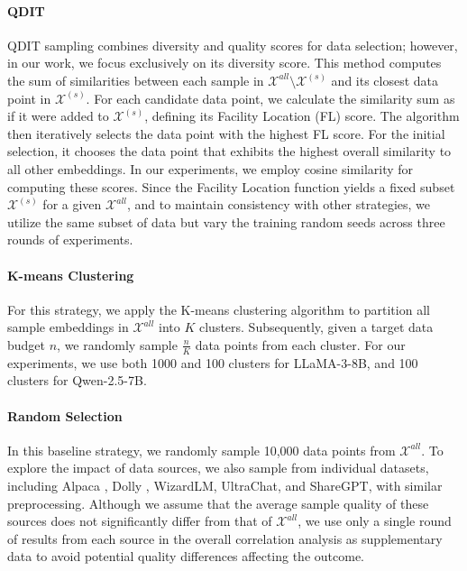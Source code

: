 \paragraph{QDIT} \cite{bukharin2023data-QDIT} QDIT sampling combines diversity and quality scores for data selection; however, in our work, we focus exclusively on its diversity score. This method computes the sum of similarities between each sample in $\mathcal{X}^{all} \setminus \mathcal{X}^{(s)}$ and its closest data point in $\mathcal{X}^{(s)}$. For each candidate data point, we calculate the similarity sum as if it were added to $\mathcal{X}^{(s)}$, defining its Facility Location (FL) score. The algorithm then iteratively selects the data point with the highest FL score. For the initial selection, it chooses the data point that exhibits the highest overall similarity to all other embeddings. In our experiments, we employ cosine similarity for computing these scores. Since the Facility Location function yields a fixed subset $\mathcal{X}^{(s)}$ for a given $\mathcal{X}^{all}$, and to maintain consistency with other strategies, we utilize the same subset of data but vary the training random seeds across three rounds of experiments.

\paragraph{K-means Clustering} \cite{song2024iterselecttune-Kmeans} For this strategy, we apply the K-means clustering algorithm to partition all sample embeddings in $\mathcal{X}^{all}$ into $K$ clusters. Subsequently, given a target data budget $n$, we randomly sample $\frac{n}{K}$ data points from each cluster. For our experiments, we use both 1000 and 100 clusters for LLaMA-3-8B, and 100 clusters for Qwen-2.5-7B.

\paragraph{Random Selection} In this baseline strategy, we randomly sample 10,000 data points from $\mathcal{X}^{all}$. To explore the impact of data sources, we also sample from individual datasets, including Alpaca \cite{alpaca}, Dolly \cite{dolly}, WizardLM, UltraChat, and ShareGPT, with similar preprocessing. Although we assume that the average sample quality of these sources does not significantly differ from that of $\mathcal{X}^{all}$, we use only a single round of results from each source in the overall correlation analysis as supplementary data to avoid potential quality differences affecting the outcome.


